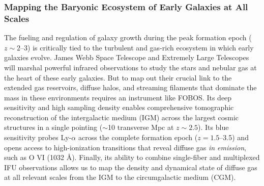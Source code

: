 \documentclass[oneside,11pt]{amsart}
\begin{document}

\subsubsection{Mapping the Baryonic Ecosystem of Early Galaxies at All Scales}
\label{sec:galaxies}


The fueling and regulation of galaxy growth during the peak formation epoch ($z \sim2$--3) is critically tied to the turbulent and gas-rich ecosystem in which early galaxies evolve.  James Webb Space Telescope and Extremely Large Telescopes will marshal powerful infrared observations to study the stars and nebular gas at the heart of these early galaxies.  But to map out their crucial link to the extended gas reservoirs, diffuse halos, and streaming filaments that dominate the mass in these environments requires an instrument like FOBOS.  Its deep sensitivity and high sampling density enables comprehensive tomographic reconstruction of the intergalactic medium (IGM) across the largest cosmic structures in a single pointing ($\sim$10 transverse Mpc at $z \sim 2.5$).  Its blue sensitivity probes Ly-$\alpha$ across the complete formation epoch ($z = 1.5$--3.5) and opens access to high-ionization transitions that reveal diffuse gas \emph{in emission}, such as O VI (1032 \AA).  Finally, its ability to combine single-fiber and multiplexed IFU observations allows us to map the density and dynamical state of diffuse gas at all relevant scales from the IGM to the circumgalactic medium (CGM).


\end{document}
